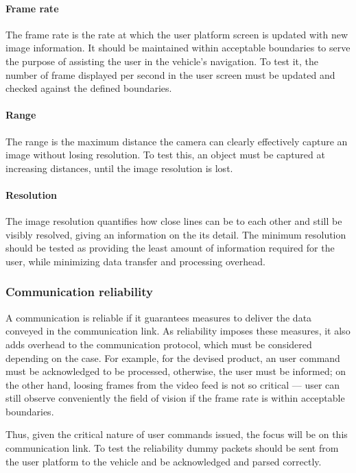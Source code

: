 \paragraph{Frame rate}%
\label{sec:frame-rate-test}
The frame rate is the rate at which the user platform screen is updated with new
image information. It should be maintained within acceptable boundaries to serve
the purpose of assisting the user in the vehicle's navigation. To test it, the
number of frame displayed per second in the user screen must be updated and
checked against the defined boundaries.

\paragraph{Range}%
\label{sec:range-test}
The range is the maximum distance the camera can clearly effectively capture an
image without losing resolution. To test this, an object must be captured at
increasing distances, until the image resolution is lost.

\paragraph{Resolution}%
\label{sec:resolution-test}
The image resolution quantifies how close lines can be to each other and still
be visibly resolved, giving an information on the its detail. The minimum
resolution should be tested as providing the least amount of information
required for the user, while minimizing data transfer and processing overhead.

\subsubsection{Communication reliability}%
\label{sec:comm-reli}
A communication is reliable if it guarantees measures to deliver the data
conveyed in the communication link. As reliability imposes these measures, it
also adds overhead to the communication protocol, which must be considered
depending on the case. For example, for the devised product, an user command
must be acknowledged to be processed, otherwise, the user must be informed; on
the other hand, loosing frames from the video feed is not so critical --- user
can still observe conveniently the field of vision if the frame rate is within
acceptable boundaries. 

Thus, given the critical nature of user commands issued, the focus will be on
this communication link. To test the reliability dummy packets should be sent
from the user platform to the vehicle and be acknowledged and parsed correctly.

